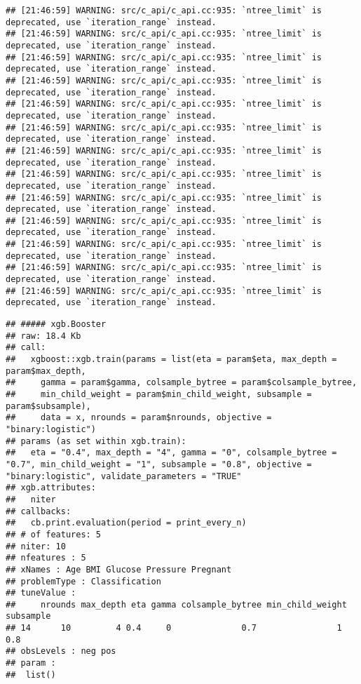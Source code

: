 \documentclass[
]{article}
\newenvironment{Shaded}{\begin{snugshade}}{\end{snugshade}}
\newcommand{\AttributeTok}[1]{\textcolor[rgb]{0.13,0.29,0.53}{#1}}
\newcommand{\CommentTok}[1]{\textcolor[rgb]{0.56,0.35,0.01}{\textit{#1}}}
\newcommand{\FunctionTok}[1]{\textcolor[rgb]{0.13,0.29,0.53}{\textbf{#1}}}
\newcommand{\NormalTok}[1]{#1}
\newcommand{\OtherTok}[1]{\textcolor[rgb]{0.56,0.35,0.01}{#1}}
\newcommand{\SpecialCharTok}[1]{\textcolor[rgb]{0.81,0.36,0.00}{\textbf{#1}}}
\begin{document}
\begin{verbatim}
## [21:46:59] WARNING: src/c_api/c_api.cc:935: `ntree_limit` is deprecated, use `iteration_range` instead.
## [21:46:59] WARNING: src/c_api/c_api.cc:935: `ntree_limit` is deprecated, use `iteration_range` instead.
## [21:46:59] WARNING: src/c_api/c_api.cc:935: `ntree_limit` is deprecated, use `iteration_range` instead.
## [21:46:59] WARNING: src/c_api/c_api.cc:935: `ntree_limit` is deprecated, use `iteration_range` instead.
## [21:46:59] WARNING: src/c_api/c_api.cc:935: `ntree_limit` is deprecated, use `iteration_range` instead.
## [21:46:59] WARNING: src/c_api/c_api.cc:935: `ntree_limit` is deprecated, use `iteration_range` instead.
## [21:46:59] WARNING: src/c_api/c_api.cc:935: `ntree_limit` is deprecated, use `iteration_range` instead.
## [21:46:59] WARNING: src/c_api/c_api.cc:935: `ntree_limit` is deprecated, use `iteration_range` instead.
## [21:46:59] WARNING: src/c_api/c_api.cc:935: `ntree_limit` is deprecated, use `iteration_range` instead.
## [21:46:59] WARNING: src/c_api/c_api.cc:935: `ntree_limit` is deprecated, use `iteration_range` instead.
## [21:46:59] WARNING: src/c_api/c_api.cc:935: `ntree_limit` is deprecated, use `iteration_range` instead.
## [21:46:59] WARNING: src/c_api/c_api.cc:935: `ntree_limit` is deprecated, use `iteration_range` instead.
## [21:46:59] WARNING: src/c_api/c_api.cc:935: `ntree_limit` is deprecated, use `iteration_range` instead.
\end{verbatim}

\begin{Shaded}
\end{Shaded}

\begin{verbatim}
## ##### xgb.Booster
## raw: 18.4 Kb 
## call:
##   xgboost::xgb.train(params = list(eta = param$eta, max_depth = param$max_depth, 
##     gamma = param$gamma, colsample_bytree = param$colsample_bytree, 
##     min_child_weight = param$min_child_weight, subsample = param$subsample), 
##     data = x, nrounds = param$nrounds, objective = "binary:logistic")
## params (as set within xgb.train):
##   eta = "0.4", max_depth = "4", gamma = "0", colsample_bytree = "0.7", min_child_weight = "1", subsample = "0.8", objective = "binary:logistic", validate_parameters = "TRUE"
## xgb.attributes:
##   niter
## callbacks:
##   cb.print.evaluation(period = print_every_n)
## # of features: 5 
## niter: 10
## nfeatures : 5 
## xNames : Age BMI Glucose Pressure Pregnant 
## problemType : Classification 
## tuneValue :
##     nrounds max_depth eta gamma colsample_bytree min_child_weight subsample
## 14      10         4 0.4     0              0.7                1       0.8
## obsLevels : neg pos 
## param :
##  list()
\end{verbatim}
\end{document}
